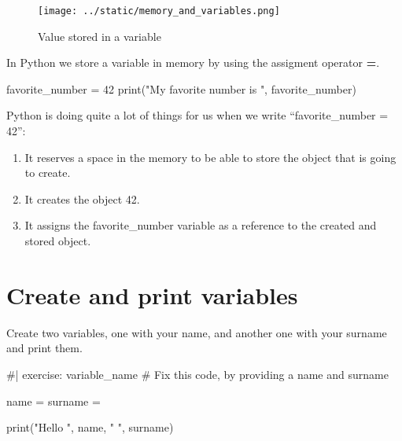 \documentclass[
  letterpaper,
  DIV=11,
  numbers=noendperiod]{scrreprt}
\newenvironment{Shaded}{\begin{snugshade}}{\end{snugshade}}
\newcommand{\NormalTok}[1]{\textcolor[rgb]{0.00,0.23,0.31}{#1}}
\providecommand{\tightlist}{%
  \setlength{\itemsep}{0pt}\setlength{\parskip}{0pt}}\usepackage{longtable,booktabs,array}
\theoremstyle{remark}
\begin{document}
\begin{figure}[H]

{\centering \texttt{[image: ../static/memory\_and\_variables.png]}

}

\caption{Value stored in a variable}

\end{figure}%

In Python we store a variable in memory by using the assigment operator
\textbf{=}.

\begin{Shaded}
\begin{Highlighting}[]
\NormalTok{favorite\_number = 42}
\NormalTok{print("My favorite number is ", favorite\_number)}
\end{Highlighting}
\end{Shaded}

Python is doing quite a lot of things for us when we write
``favorite\_number = 42'':

\begin{enumerate}
\def\labelenumi{\arabic{enumi}.}
\tightlist
\item
  It reserves a space in the memory to be able to store the object that
  is going to create.
\item
  It creates the object 42.
\item
  It assigns the favorite\_number variable as a reference to the created
  and stored object.
\end{enumerate}

\section{Create and print variables}\label{create-and-print-variables}

Create two variables, one with your name, and another one with your
surname and print them.

\begin{Shaded}
\begin{Highlighting}[]
\NormalTok{\#| exercise: variable\_name}
\NormalTok{\# Fix this code, by providing a name and surname}

\NormalTok{name = }
\NormalTok{surname =}

\NormalTok{print("Hello ", name, " ", surname)}
\end{Highlighting}
\end{Shaded}
\end{document}
